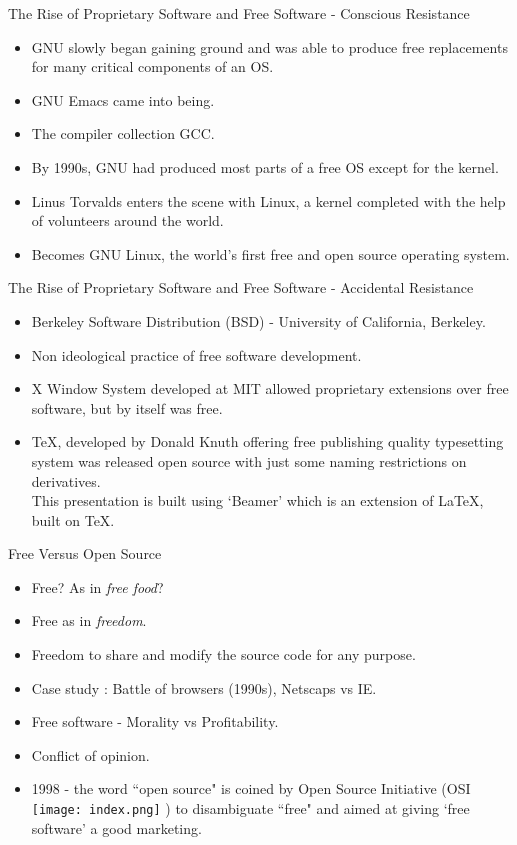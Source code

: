 \documentclass{beamer}
\begin{document}
\begin{frame}{The Rise of Proprietary Software and Free Software - Conscious Resistance}
\begin{itemize}
	\item GNU slowly began gaining ground and was able to produce free replacements for many critical components of an OS. 
	\item GNU Emacs came into being. 
	\item The compiler collection GCC. 
	\item By 1990s, GNU had produced most parts of a free OS except for the kernel. 
	\item Linus Torvalds enters the scene with Linux, a kernel completed with the help of volunteers around the world. 
	\item Becomes GNU Linux, the world's first free and open source operating system.
\end{itemize}
\end{frame}

\begin{frame}{The Rise of Proprietary Software and Free Software - Accidental Resistance}
\begin{itemize}
	\item Berkeley Software Distribution (BSD) - University of California, Berkeley. 
	\item Non ideological practice of free software development. 
	\item X Window System developed at MIT allowed proprietary extensions over free software, but by itself was free. 
	\item \TeX , developed by Donald Knuth offering free publishing quality typesetting system was released open source with just some naming restrictions on derivatives. 
	\vspace{0.4cm} \\This presentation is built using `Beamer' which is an extension of \LaTeX , built on \TeX.
\end{itemize}
\end{frame}

\begin{frame}{Free Versus Open Source}
\begin{itemize}
	\item Free? As in \emph{free food}? 
	\item Free as in \emph{freedom}. 
	\item Freedom to share and modify the source code for any purpose.
	\item Case study : Battle of browsers (1990s), Netscaps vs IE.
	\item Free software - Morality vs Profitability.
	\item Conflict of opinion.
	\item 1998 - the word ``open source" is coined by Open Source Initiative (OSI \texttt{[image: index.png]} ) to disambiguate ``free" and aimed at giving `free software' a good marketing.
\end{itemize}
\end{frame}
\end{document}
